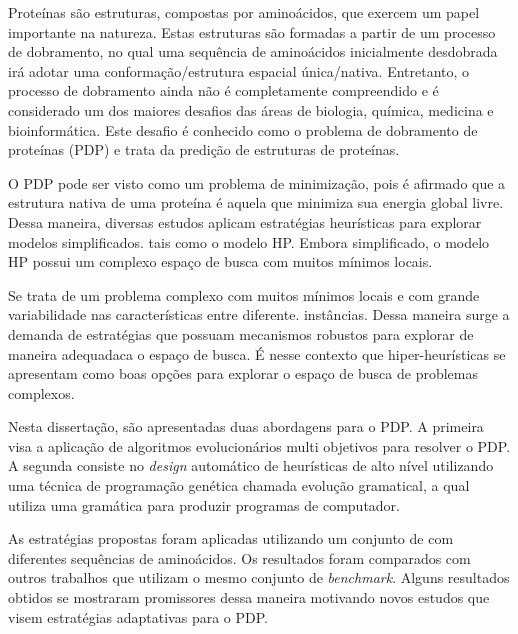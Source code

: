 \begin{resumo}


Proteínas são estruturas, compostas por aminoácidos, que exercem um papel importante na natureza. Estas estruturas são formadas a partir de um processo de dobramento, no qual uma sequência de aminoácidos inicialmente desdobrada irá adotar uma conformação/estrutura espacial única/nativa. Entretanto, o processo de dobramento ainda não é completamente compreendido e é considerado um dos maiores desafios das áreas de biologia, química, medicina e bioinformática. Este desafio é conhecido como o problema de dobramento de proteínas (PDP) e trata da predição de estruturas de proteínas. 

O PDP pode ser visto como um problema de minimização, pois é afirmado que a estrutura nativa de uma proteína é aquela que minimiza sua energia global livre. Dessa maneira, diversas estudos aplicam estratégias heurísticas para explorar modelos simplificados. tais como o modelo HP. Embora simplificado, o modelo HP possui um complexo espaço de busca com muitos mínimos locais.  


 Se trata de um problema complexo com muitos mínimos locais e com grande variabilidade nas características entre diferente. instâncias. Dessa maneira surge a demanda de estratégias que possuam mecanismos robustos para explorar de maneira adequadaca o espaço de busca. É nesse contexto que hiper-heurísticas se apresentam como boas opções para explorar o espaço de busca de problemas complexos. 



Nesta dissertação, são apresentadas duas abordagens para o PDP. A primeira visa a aplicação de algoritmos evolucionários multi objetivos para resolver o PDP. A segunda consiste no \textit{design} automático de heurísticas de alto nível utilizando uma técnica de programação genética chamada evolução gramatical, a qual utiliza uma gramática para produzir programas de computador. 

 As estratégias propostas foram aplicadas utilizando um conjunto de  com diferentes sequências de aminoácidos. Os resultados foram comparados com outros trabalhos que utilizam o mesmo conjunto de \textit{benchmark}. Alguns resultados obtidos se mostraram promissores dessa maneira motivando novos estudos que visem estratégias adaptativas para o PDP.



\end{resumo}

